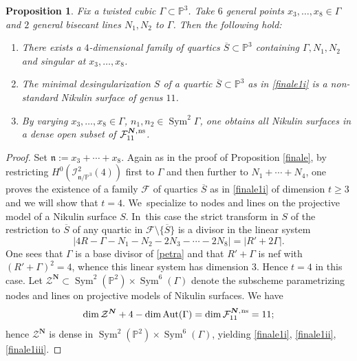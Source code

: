 \documentclass[11pt]{article}
\newcommand{\ns}{{\mkern1mu\mathrm{ns}}}
\newcommand{\bN}{\boldsymbol{N}}
\theoremstyle{plain}
\newtheorem{prop}[thm]{Proposition}
\theoremstyle{definition}
\DeclareMathOperator{\Aut}{Aut}
\DeclareMathOperator{\Sym}{Sym}
\newcommand\PP{{\mathbb P}}
\newcommand\F{{\mathcal F}}
\newcommand\Z{{\mathcal Z}}
\begin{document}
\begin{prop}\label{finale1}
Fix a twisted cubic $\Gamma\subset \PP^3$. Take $6$ general points $x_3,\ldots,x_8\in \Gamma$ and $2$ general bisecant lines $N_1,N_2$ to $\Gamma$. Then the following hold:
\begin{enumerate}
\item\label{finale1i}
There exists a $4$-dimensional family of quartics $\overline{S}\subset\mathbb P^3$ containing $\Gamma,N_1,N_2$ and singular at $x_3,\ldots,x_8$.
\item\label{finale1ii}
The minimal desingularization $S$ of a quartic $\overline{S}\subset\mathbb P^3$ as in \eqref{finale1i} is a non-standard Nikulin surface of genus $11$.
\item\label{finale1iii}
By varying $x_3,\ldots,x_8\in \Gamma$, $n_1, n_2\in \Sym^2\Gamma$, one obtains all Nikulin surfaces in a dense open subset of $\F_{11}^{\bN,\ns}$.
\end{enumerate}
\end{prop}

\begin{proof}
Set $\mathfrak n:=x_3+\cdots+x_8$. Again as in the proof of Proposition \ref{finale}, by restricting $H^0(\mathcal I^2_{\mathfrak{n}/\PP^3}(4))$ first to $\Gamma$ and then further to $N_1+\cdots+N_4$, one proves the existence of a family $\F$ of quartics $\overline{S}$ as in \eqref{finale1i} of dimension $t\geq 3$ and we will show that $t=4$. We~specialize to nodes and lines on the projective model of a Nikulin surface $S$. In~this case the strict transform in $S$ of the restriction to $\overline S$ of any quartic in $\F\setminus\{\overline S\}$ is a divisor in the linear system\vspace*{-3pt}
\begin{equation}\label{petra}|4R-\Gamma-N_1-N_2-2N_3-\cdots-2N_8|=|R'+2\Gamma|.\end{equation} One sees that $\Gamma$ is a base divisor of \eqref{petra} and that $R'+\Gamma$ is nef with \hbox{$(R'+\Gamma)^2=4$}, whence this linear system has dimension $3$. Hence $t= 4$ in this case. Let $\Z^{\bN}\subset \Sym^2(\PP^2)\times \Sym^6(\Gamma)$ denote the subscheme parametrizing nodes and lines on projective models of Nikulin surfaces. We have\vspace*{-3pt}
\[
\dim \Z^{\bN}+4-\dim\Aut(\Gamma)=\dim\F_{11}^{\bN,\ns}=11;
\]
hence $\Z^{\bN}$ is dense in $\Sym^2(\PP^2)\times \Sym^6(\Gamma)$, yielding \eqref{finale1i}, \eqref{finale1ii}, \eqref{finale1iii}.
\end{proof}
\end{document}
